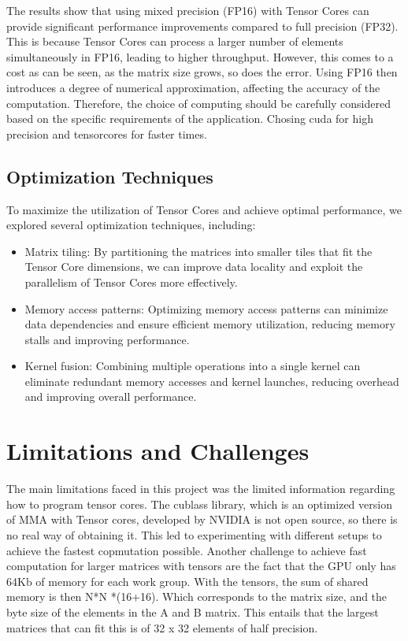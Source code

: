 \documentclass[conference]{IEEEtran}
\begin{document}
  The results show that using mixed precision (FP16) with Tensor Cores can provide significant performance improvements compared to full precision (FP32).
  This is because Tensor Cores can process a larger number of elements simultaneously in FP16,
  leading to higher throughput. However, this comes to a cost as can be seen, as the matrix size grows, so does the error.
  Using FP16 then introduces a degree of numerical approximation, affecting the accuracy of the computation.
  Therefore, the choice of computing should be carefully considered based on the specific
  requirements of the application. Chosing cuda for high precision and tensorcores for faster times.
  
  \subsection{Optimization Techniques}\label{sec:optimization-techniques}
  
  To maximize the utilization of Tensor Cores and achieve optimal performance, we explored several optimization techniques, including:
  
  \begin{itemize}
    \item Matrix tiling: By partitioning the matrices
    into smaller tiles that fit the Tensor Core dimensions, we can improve data locality 
    and exploit the parallelism of Tensor Cores more effectively.
    \item Memory access patterns: Optimizing memory access patterns can minimize data 
    dependencies and ensure efficient memory utilization, reducing memory stalls and improving 
    performance.
    \item Kernel fusion: Combining multiple operations into a single kernel can eliminate 
    redundant memory accesses and kernel launches, reducing overhead and improving overall performance.
    
  \end{itemize}
  
  \section{Limitations and Challenges}\label{sec:limitations-challenges}
  The main limitations faced in this project was the limited information regarding how to program tensor cores.
  The cublass library, which is an optimized version of MMA with Tensor cores, developed by NVIDIA is not open source,
  so there is no real way of obtaining it. This led to experimenting with different setups to achieve the fastest copmutation possible.
  Another challenge to achieve fast computation for larger matrices with tensors are the fact that the GPU 
  only has 64Kb of memory for each work group. With the tensors, the sum of shared memory is then N*N *(16+16).
  Which corresponds to the matrix size, and the byte size of the elements in the A and B matrix. This entails that the 
  largest matrices that can fit this is of 32 x 32 elements of half precision.
\end{document}
